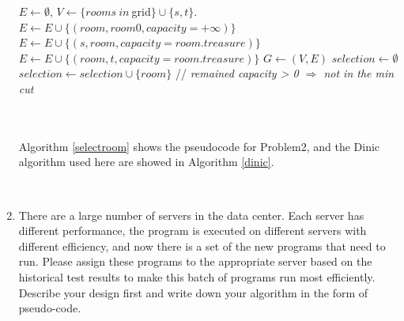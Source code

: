 \documentclass{article}
\begin{document}
\begin{enumerate}
\begin{minipage}[htb]{0.9\textwidth}
\begin{algorithm}[H]
\begin{algorithmic}[1]
        \State $E\leftarrow \emptyset$, $V\leftarrow \{rooms\ in\ $grid$\} \cup \{s, t\}$.
                    \State $E \leftarrow E\cup \{(room, room0, capacity=+\infty)\}$
                \EndFor
                \State $E \leftarrow E\cup \{(s, room, capacity=room.treasure)\}$
            \Else
                \State $E \leftarrow E\cup \{(room, t, capacity=room.treasure)\}$
            \EndIf
        \EndFor
        \State $G \leftarrow (V, E)$
            \State {}
        \EndWhile
        \State $selection\leftarrow \emptyset$
                \State $selection\leftarrow selection\cup\{room\}$ // \textit{remained capacity > 0 $\Rightarrow$ not in the min cut}
            \EndIf
        \EndFor
        \State {}
    \EndFunction
\end{algorithmic}
\end{algorithm}
\end{minipage}
~\\~\\Algorithm \ref{selectroom} shows the pseudocode for Problem2, and the Dinic algorithm used here are showed in Algorithm \ref{dinic}.

~\\
\item There are a large number of servers in the data center. Each server has different performance, the program is executed on different servers with different efficiency, and now there is a set of the new programs that need to run. Please assign these programs to the appropriate server based on the historical test results to make this batch of programs run most efficiently. 
Describe your design first and write down your algorithm in the form of pseudo-code.


\end{enumerate}
\end{document}
